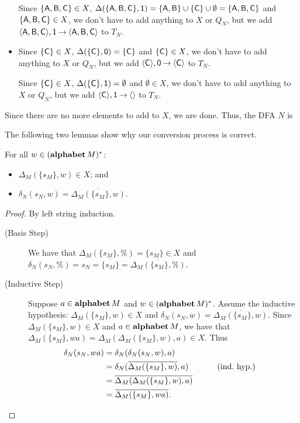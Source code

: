\begin{itemize}
  Since $\{\mathsf{A},\mathsf{B},\mathsf{C}\}\in X$,
  $\Delta(\{\mathsf{A},\mathsf{B},\mathsf{C}\},\mathsf{1})=\{\mathsf{A},\mathsf{B}\}\cup\{\mathsf{C}\}\cup\emptyset=
  \{\mathsf{A},\mathsf{B},\mathsf{C}\}$ and $\{\mathsf{A},\mathsf{B},\mathsf{C}\}\in X$, we don't have to
  add anything to $X$ or $Q_N$, but we add
  $\langle\mathsf{A},\mathsf{B},\mathsf{C}\rangle,\mathsf{1}\mathbin{\to}\langle\mathsf{A},\mathsf{B},\mathsf{C}\rangle$
  to $T_N$.

\item Since $\{\mathsf{C}\}\in X$, $\Delta(\{\mathsf{C}\},\mathsf{0})=\{\mathsf{C}\}$ and
  $\{\mathsf{C}\}\in X$, we don't have to add anything to $X$ or $Q_N$, but
  we add $\langle\mathsf{C}\rangle,\mathsf{0}\mathbin{\to}\langle\mathsf{C}\rangle$ to $T_N$.

  Since $\{\mathsf{C}\}\in X$, $\Delta(\{\mathsf{C}\},\mathsf{1})=\emptyset$ and
  $\emptyset\in X$, we don't have to add anything to $X$ or $Q_N$, but
  we add $\langle\mathsf{C}\rangle,\mathsf{1}\mathbin{\to}\langle\rangle$ to $T_N$.
\end{itemize}
Since there are no more elements to add to $X$, we are done.
Thus, the DFA $N$ is
\begin{center}

\end{center}

The following two lemmas show why our conversion process is correct.

\begin{lemma}
\label{NFAToDFAConvLemma}
For all $w\in(\mathbf{alphabet}\,M)^*$:
\begin{itemize}
\item $\Delta_M(\{s_M\},w)\in X$; and
\item $\delta_N(s_N,w)=\overline{\Delta_M(\{s_M\},w)}$.
\end{itemize}
\end{lemma}

\begin{proof}
By left string induction.
\begin{description}
\item[\quad(Basis Step)] We have that $\Delta_M(\{s_M\},\%) = \{s_M\}\in X$
and $\delta_N(s_N,\%)= {s_N}= {\overline{\{s_M\}}}=
{\overline{\Delta_M(\{s_M\},\%)}}$.

\item[\quad(Inductive Step)] Suppose $a\in\mathbf{alphabet}\,M$ and
  $w\in(\mathbf{alphabet}\,M)^*$.  Assume the inductive hypothesis:
  $\Delta_M(\{s_M\},w)\in X$ and
  $\delta_N(s_N,w)=\overline{\Delta_M(\{s_M\},w)}$.  Since
  $\Delta_M(\{s_M\},w)\in X$ and $a\in\mathbf{alphabet}\,M$, we have that
  $\Delta_M(\{s_M\},wa) = \Delta_M(\Delta_M(\{s_M\},w),a)\in X$.  Thus
  \begin{alignat*}{2}
    \delta_N(s_N,wa) &= \delta_N(\delta_N(s_N,w),a) \\
    &= \delta_N(\overline{\Delta_M(\{s_M\},w)},a) &&
    \qquad{\textrm{(ind.\ hyp.)}} \\
    &= \overline{\Delta_M(\Delta_M(\{s_M\},w),a)} \\
    &= \overline{\Delta_M(\{s_M\},wa)} .
  \end{alignat*}
\end{description}
\end{proof}

